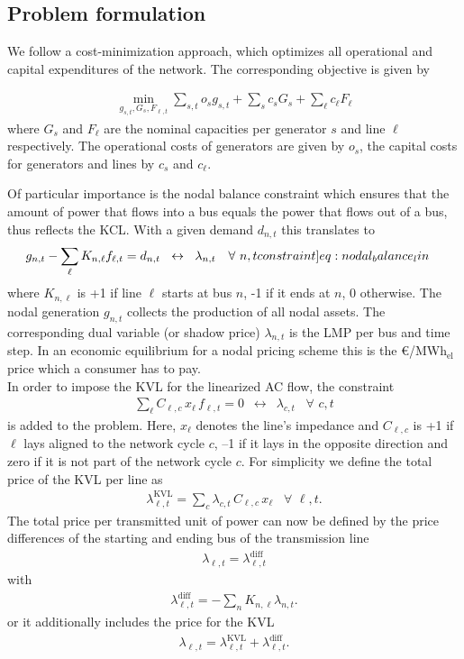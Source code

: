 \documentclass[11pt,twocolumn]{article}
\newcommand{\resultsin}[1]{\hspace{6pt} \leftrightarrow  \hspace{6pt} #1}
\newcommand{\Forall}[1]{\hspace{10pt} \forall \,\, #1 }
\newcommand{\nodalgeneration}[1][n]{g_{#1,t}}
\newcommand{\flow}{f_{\ell,t}}
\newcommand{\lmp}[1][n]{\lambda_{#1,t}}
\newcommand{\lmpdiff}[1][\ell]{\lmp[#1]^\text{diff}}
\newcommand{\lmpkvl}[1][\ell]{\lmp[#1]^\text{KVL}}
\newcommand{\demand}[1][n]{d_{#1,t}}
\newcommand{\incidence}[1][n]{K_{#1,\ell}}
\newcommand{\cycle}{C_{\ell,c}}
\newcommand{\reactance}{x_\ell}
\newcommand{\cycleprice}{\lambda_{c,t}}
\newcommand{\megawatthour}{MWh$_\text{el}$}
\begin{document}
\subsection{Problem formulation}
\label{sec:problem_formulation}

We follow a cost-minimization approach, which optimizes all operational and capital expenditures of the network. The corresponding objective is given by 

\begin{align}
    \min_{g_{s,t}, G_s, F_{\ell, t}} \sum_{s,t} o_s g_{s,t} + \sum_s c_s G_s + \sum_\ell c_\ell F_\ell
\end{align}
where $G_s$ and $F_\ell$ are the nominal capacities per generator $s$ and line $\ell$ respectively. The operational costs of generators are given by $o_s$, the capital costs for generators and lines by $c_s$ and $c_\ell$. 

Of particular importance is the nodal balance constraint which ensures that the amount of power that flows into a bus equals the power that flows out of a bus, thus reflects the \ac{KCL}. With a given demand $\demand$ this translates to   
\begin{align}
    \nodalgeneration - \sum_\ell \incidence \flow  &=  \demand 
     \resultsin{\lmp} \Forall{n,t}
    \label[constraint]{eq:nodal_balance_lin}
\end{align}
where $\incidence$ is +1 if line $\ell$ starts at bus $n$, -1 if it ends at $n$, 0 otherwise. The nodal generation $\nodalgeneration$ collects the production of all nodal assets. The corresponding dual variable (or shadow price) $\lmp$ is the \ac{LMP} per bus and time step. In an economic equilibrium for a nodal pricing scheme this is the \euro/\megawatthour\, price which a consumer has to pay.\\

In order to impose the \ac{KVL} for the linearized \ac{AC} flow, the constraint 
\begin{align}
    \sum_{\ell} \cycle \, \reactance \, \flow = 0 \resultsin{\cycleprice} \Forall{c,t} 
\end{align}
is added to the problem. Here, $\reactance$ denotes the line's impedance and $\cycle$ is +1 if $\ell$ lays aligned to the network cycle $c$, --1 if it lays in the opposite direction and zero if it is not part of the network cycle $c$.
For simplicity we define the total price of the \ac{KVL} per line as 
\begin{align}
    \lmpkvl = \sum_c \cycleprice\, \cycle\, \reactance \Forall{\ell,t} .
\end{align} 
The total price per transmitted unit of power can now be defined by the price differences of the starting and ending bus of the transmission line
\begin{align}
    \lmp[\ell] = \lmpdiff 
\end{align}
with 
\begin{align}
    \lmpdiff = -\sum_n \incidence \lmp .
\end{align}
or it additionally includes the price for the \ac{KVL}
\begin{align}
    \lmp[\ell] = \lmpkvl + \lmpdiff .
    \label{eq:congestion_price}
\end{align}
\end{document}
